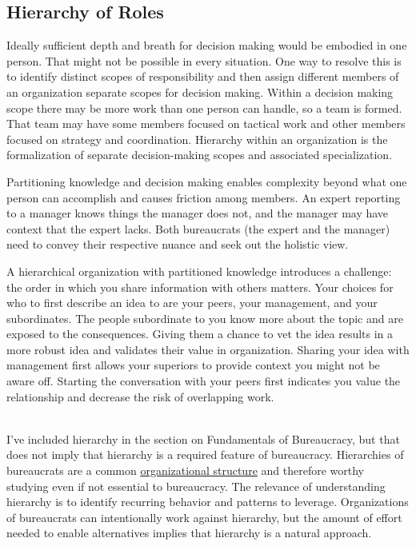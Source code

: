 \subsection{Hierarchy of Roles\label{sec:hierarchy_of_roles}}

Ideally sufficient depth and breath for decision making would be embodied in one person. That might not be possible in every situation. One way to resolve this is to identify distinct scopes of responsibility and then assign different members of an organization separate scopes for decision making. Within a decision making scope there may be more work than one person can handle, so a team is formed. That team may have some members focused on tactical work and other members focused on strategy and coordination. Hierarchy within an organization is the formalization of separate decision-making scopes and associated specialization. 

Partitioning knowledge and decision making enables complexity beyond what one person can accomplish and causes friction among members. An expert reporting to a manager knows things the manager does not, and the manager may have context that the expert lacks. Both bureaucrats (the expert and the manager) need to convey their respective nuance and seek out the holistic view.

A hierarchical organization with partitioned knowledge introduces a challenge: the order in which you share information with others matters. Your choices for who to first describe an idea to are your peers, your management, and your subordinates.  The people subordinate to you know more about the topic and are exposed to the consequences. Giving them a chance to vet the idea results in a more robust idea and validates their value in organization. Sharing your idea with management first allows your superiors to provide context you might not be aware off. Starting the conversation with your peers first indicates you value the relationship and decrease the risk of overlapping work.

\ \\

I've included hierarchy in the section on Fundamentals of Bureaucracy, but that does not imply that hierarchy is a required feature of bureaucracy. Hierarchies of bureaucrats are a common \href{https://en.wikipedia.org/wiki/Organizational_structure}{organizational structure} and therefore worthy studying even if not essential to bureaucracy. The relevance of understanding hierarchy is to identify recurring behavior and patterns to leverage.
Organizations of bureaucrats can intentionally work against hierarchy, but the amount of effort needed to enable alternatives implies that hierarchy is a natural approach.

